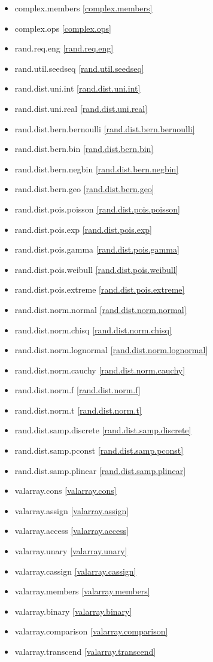 \begin{multicols}{3}
\begin{itemize}
\item{complex.members}			\ref{complex.members}
\item{complex.ops}				\ref{complex.ops}
\item{rand.req.eng}				\ref{rand.req.eng}
\item{rand.util.seedseq}		\ref{rand.util.seedseq}
\item{rand.dist.uni.int}		\ref{rand.dist.uni.int}
\item{rand.dist.uni.real}		\ref{rand.dist.uni.real}
\item{rand.dist.bern.bernoulli}	\ref{rand.dist.bern.bernoulli}
\item{rand.dist.bern.bin}		\ref{rand.dist.bern.bin}
\item{rand.dist.bern.negbin}	\ref{rand.dist.bern.negbin}
\item{rand.dist.bern.geo}		\ref{rand.dist.bern.geo}
\item{rand.dist.pois.poisson}	\ref{rand.dist.pois.poisson}
\item{rand.dist.pois.exp}		\ref{rand.dist.pois.exp}
\item{rand.dist.pois.gamma}		\ref{rand.dist.pois.gamma}
\item{rand.dist.pois.weibull}	\ref{rand.dist.pois.weibull}
\item{rand.dist.pois.extreme}	\ref{rand.dist.pois.extreme}
\item{rand.dist.norm.normal}	\ref{rand.dist.norm.normal}
\item{rand.dist.norm.chisq}		\ref{rand.dist.norm.chisq}
\item{rand.dist.norm.lognormal}	\ref{rand.dist.norm.lognormal}
\item{rand.dist.norm.cauchy}	\ref{rand.dist.norm.cauchy}
\item{rand.dist.norm.f}			\ref{rand.dist.norm.f}
\item{rand.dist.norm.t}			\ref{rand.dist.norm.t}
\item{rand.dist.samp.discrete}	\ref{rand.dist.samp.discrete}
\item{rand.dist.samp.pconst}	\ref{rand.dist.samp.pconst}
\item{rand.dist.samp.plinear}	\ref{rand.dist.samp.plinear}
\item{valarray.cons}			\ref{valarray.cons}
\item{valarray.assign}			\ref{valarray.assign}
\item{valarray.access}			\ref{valarray.access}
\item{valarray.unary}			\ref{valarray.unary}
\item{valarray.cassign}			\ref{valarray.cassign}
\item{valarray.members}			\ref{valarray.members}
\item{valarray.binary}			\ref{valarray.binary}
\item{valarray.comparison}		\ref{valarray.comparison}
\item{valarray.transcend}		\ref{valarray.transcend}
\end{itemize}
\end{multicols}

